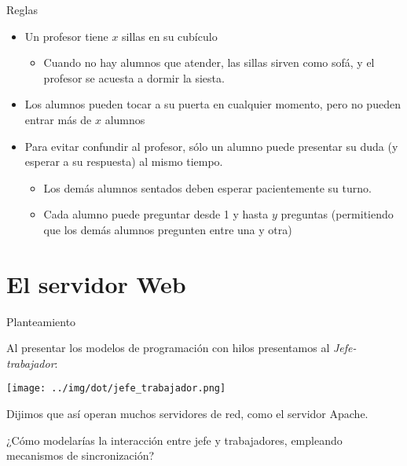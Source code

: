 \documentclass[presentation]{beamer}
\begin{document}
\begin{frame}[label={sec:orgc37392f}]{Reglas}
\begin{itemize}
\item Un profesor tiene \(x\) sillas en su cubículo
\begin{itemize}
\item Cuando no hay alumnos que atender, las sillas sirven como sofá, y
el profesor se acuesta a dormir la siesta.
\end{itemize}
\item Los alumnos pueden tocar a su puerta en cualquier momento, pero no
pueden entrar más de \(x\) alumnos
\item Para evitar confundir al profesor, sólo un alumno puede presentar su
duda (y esperar a su respuesta) al mismo tiempo.
\begin{itemize}
\item Los demás alumnos sentados deben esperar pacientemente su turno.
\item Cada alumno puede preguntar desde 1 y hasta \(y\) preguntas
(permitiendo que los demás alumnos pregunten entre una y otra)
\end{itemize}
\end{itemize}
\end{frame}

\section{El servidor Web}
\label{sec:orgffff576}
\begin{frame}[label={sec:org350e633}]{Planteamiento}
\begin{center}
Al presentar los modelos de programación con hilos presentamos al
\emph{Jefe-trabajador}:

\begin{center}
\texttt{[image: ../img/dot/jefe\_trabajador.png]}
\end{center}

Dijimos que así operan muchos servidores de red, como el servidor
Apache.

¿Cómo modelarías la interacción entre jefe y trabajadores, empleando
mecanismos de sincronización?
\end{center}
\end{frame}
\end{document}

